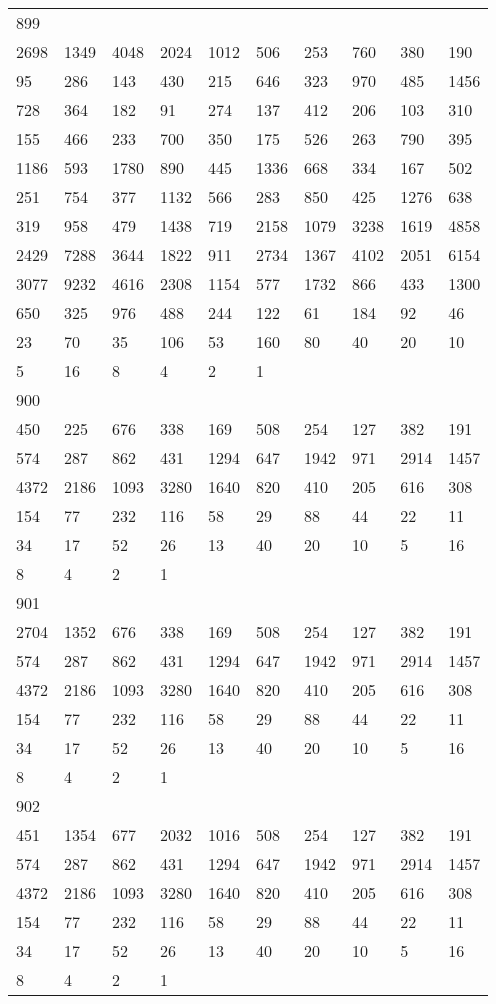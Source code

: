 \begin{longtable}{*{10}{l}}
899&&&&&&&&&\\
2698& 1349& 4048& 2024& 1012& 506& 253& 760& 380& 190\\
95& 286& 143& 430& 215& 646& 323& 970& 485& 1456\\
728& 364& 182& 91& 274& 137& 412& 206& 103& 310\\
155& 466& 233& 700& 350& 175& 526& 263& 790& 395\\
1186& 593& 1780& 890& 445& 1336& 668& 334& 167& 502\\
251& 754& 377& 1132& 566& 283& 850& 425& 1276& 638\\
319& 958& 479& 1438& 719& 2158& 1079& 3238& 1619& 4858\\
2429& 7288& 3644& 1822& 911& 2734& 1367& 4102& 2051& 6154\\
3077& 9232& 4616& 2308& 1154& 577& 1732& 866& 433& 1300\\
650& 325& 976& 488& 244& 122& 61& 184& 92& 46\\
23& 70& 35& 106& 53& 160& 80& 40& 20& 10\\
5& 16& 8& 4& 2& 1& \\

900&&&&&&&&&\\
450& 225& 676& 338& 169& 508& 254& 127& 382& 191\\
574& 287& 862& 431& 1294& 647& 1942& 971& 2914& 1457\\
4372& 2186& 1093& 3280& 1640& 820& 410& 205& 616& 308\\
154& 77& 232& 116& 58& 29& 88& 44& 22& 11\\
34& 17& 52& 26& 13& 40& 20& 10& 5& 16\\
8& 4& 2& 1& \\

901&&&&&&&&&\\
2704& 1352& 676& 338& 169& 508& 254& 127& 382& 191\\
574& 287& 862& 431& 1294& 647& 1942& 971& 2914& 1457\\
4372& 2186& 1093& 3280& 1640& 820& 410& 205& 616& 308\\
154& 77& 232& 116& 58& 29& 88& 44& 22& 11\\
34& 17& 52& 26& 13& 40& 20& 10& 5& 16\\
8& 4& 2& 1& \\

902&&&&&&&&&\\
451& 1354& 677& 2032& 1016& 508& 254& 127& 382& 191\\
574& 287& 862& 431& 1294& 647& 1942& 971& 2914& 1457\\
4372& 2186& 1093& 3280& 1640& 820& 410& 205& 616& 308\\
154& 77& 232& 116& 58& 29& 88& 44& 22& 11\\
34& 17& 52& 26& 13& 40& 20& 10& 5& 16\\
8& 4& 2& 1& \\


\end{longtable}
